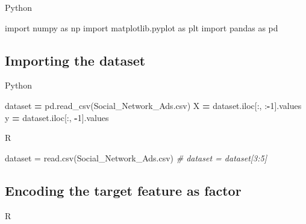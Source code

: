 \documentclass[
]{book}
\newenvironment{Shaded}{\begin{snugshade}}{\end{snugshade}}
\newcommand{\AttributeTok}[1]{\textcolor[rgb]{0.77,0.63,0.00}{#1}}
\newcommand{\CommentTok}[1]{\textcolor[rgb]{0.56,0.35,0.01}{\textit{#1}}}
\newcommand{\DecValTok}[1]{\textcolor[rgb]{0.00,0.00,0.81}{#1}}
\newcommand{\FunctionTok}[1]{\textcolor[rgb]{0.00,0.00,0.00}{#1}}
\newcommand{\ImportTok}[1]{#1}
\newcommand{\NormalTok}[1]{#1}
\newcommand{\OperatorTok}[1]{\textcolor[rgb]{0.81,0.36,0.00}{\textbf{#1}}}
\newcommand{\OtherTok}[1]{\textcolor[rgb]{0.56,0.35,0.01}{#1}}
\newcommand{\SpecialCharTok}[1]{\textcolor[rgb]{0.00,0.00,0.00}{#1}}
\newcommand{\StringTok}[1]{\textcolor[rgb]{0.31,0.60,0.02}{#1}}
\theoremstyle{definition}
\theoremstyle{definition}
\theoremstyle{definition}
\theoremstyle{definition}
\theoremstyle{remark}
\begin{document}
Python

\begin{Shaded}
\begin{Highlighting}[]
\ImportTok{import}\NormalTok{ numpy }\ImportTok{as}\NormalTok{ np}
\ImportTok{import}\NormalTok{ matplotlib.pyplot }\ImportTok{as}\NormalTok{ plt}
\ImportTok{import}\NormalTok{ pandas }\ImportTok{as}\NormalTok{ pd}
\end{Highlighting}
\end{Shaded}

\hypertarget{importing-the-dataset-7}{%
\subsection{Importing the dataset}\label{importing-the-dataset-7}}

Python

\begin{Shaded}
\begin{Highlighting}[]
\NormalTok{dataset }\OperatorTok{=}\NormalTok{ pd.read\_csv(}\StringTok{\textquotesingle{}Social\_Network\_Ads.csv\textquotesingle{}}\NormalTok{)}
\NormalTok{X }\OperatorTok{=}\NormalTok{ dataset.iloc[:, :}\OperatorTok{{-}}\DecValTok{1}\NormalTok{].values}
\NormalTok{y }\OperatorTok{=}\NormalTok{ dataset.iloc[:, }\OperatorTok{{-}}\DecValTok{1}\NormalTok{].values}
\end{Highlighting}
\end{Shaded}

R

\begin{Shaded}
\begin{Highlighting}[]
\NormalTok{dataset }\OtherTok{=} \FunctionTok{read.csv}\NormalTok{(}\StringTok{\textquotesingle{}Social\_Network\_Ads.csv\textquotesingle{}}\NormalTok{)}
\CommentTok{\# dataset = dataset[3:5]}
\end{Highlighting}
\end{Shaded}

\hypertarget{encoding-the-target-feature-as-factor}{%
\subsection{Encoding the target feature as factor}\label{encoding-the-target-feature-as-factor}}

R

\begin{Shaded}
\end{Shaded}
\end{document}
